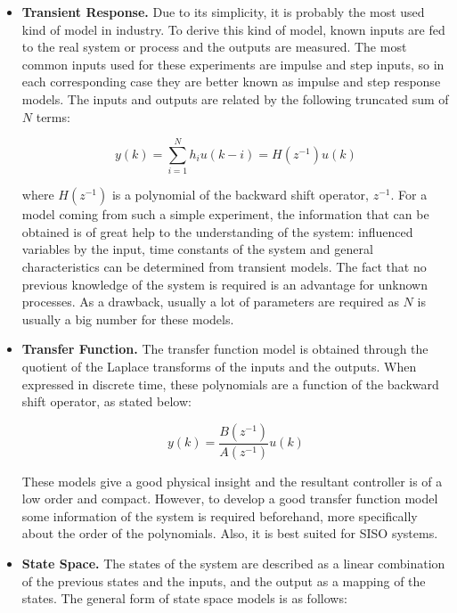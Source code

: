 \begin{itemize}

\item \textbf{Transient Response.} Due to its simplicity, it is probably the most used kind of model in industry. To derive this kind of model, known inputs are fed to the real system or process and the outputs are measured. The most common inputs used for these experiments are impulse and step inputs, so in each corresponding case they are better known as impulse and step response models. The inputs and outputs are related by the following truncated sum of $N$ terms:

\begin{equation} \label{impulsemodel1}
y(k) = \sum_{i=1}^N h_i u(k-i) = H(z^{-1})u(k)
\end{equation}

where $H(z^{-1})$ is a polynomial of the backward shift operator, $z^{-1}$. For a model coming from such a simple experiment, the information that can be obtained is of great help to the understanding of the system: influenced variables by the input, time constants of the system and general characteristics can be determined from transient models. The fact that no previous knowledge of the system is required is an advantage for unknown processes. As a drawback, usually a lot of parameters are required as $N$ is usually a big number for these models.

\item \textbf{Transfer Function.} The transfer function model is obtained through the quotient of the Laplace transforms of the inputs and the outputs. When expressed in discrete time, these polynomials are a function of the backward shift operator, as stated below:

\begin{equation} \label{transferfunctionmodel1}
y(k) = \frac{B(z^{-1})}{A(z^{-1})}u(k)
\end{equation}

These models give a good physical insight and the resultant controller is of a low order and compact. However, to develop a good transfer function model some information of the system is required beforehand, more specifically about the order of the polynomials. Also, it is best suited for SISO systems.

\item \textbf{State Space.} The states of the system are described as a linear combination of the previous states and the inputs, and the output as a mapping of the states. The general form of state space models is as follows:


\end{itemize}
